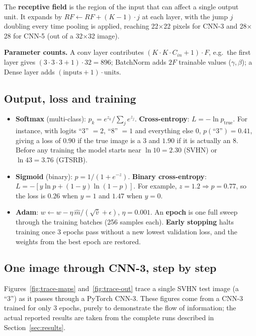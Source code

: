 \documentclass[11pt, a4paper]{article}
\begin{document}
The \textbf{receptive field} is the region of the input that can affect a single output unit. It expands by
$RF \leftarrow RF + (K-1)\cdot j$ at each layer, with the jump $j$ doubling every time pooling is applied, reaching
22$\times$22 pixels for CNN-3 and 28$\times$28 for CNN-5 (out of a 32$\times$32 image).

\textbf{Parameter counts.} A conv layer contributes $(K\cdot K\cdot C_{in}+1)\cdot F$, e.g.\ the first layer gives
$(3\cdot3\cdot3+1)\cdot32 = 896$; BatchNorm adds $2F$ trainable values ($\gamma,\beta$); a Dense layer adds
$(\text{inputs}+1)\cdot\text{units}$.

\subsection{Output, loss and training}
\begin{itemize}
\item \textbf{Softmax} (multi-class): $p_k = e^{z_k}/\sum_j e^{z_j}$. \textbf{Cross-entropy}: $L = -\ln p_{\text{true}}$.
  For instance, with logits ``3'' $=2$, ``8'' $=1$ and everything else $0$, $p(\text{``3''}) = 0.41$, giving a loss of
  $0.90$ if the true image is a 3 and $1.90$ if it is actually an 8. Before any training the model starts near
  $\ln 10 = 2.30$ (SVHN) or $\ln 43 = 3.76$ (GTSRB).
\item \textbf{Sigmoid} (binary): $p = 1/(1+e^{-z})$. \textbf{Binary cross-entropy}: $L = -[y\ln p + (1-y)\ln(1-p)]$.
  For example, $z=1.2 \Rightarrow p = 0.77$, so the loss is $0.26$ when $y=1$ and $1.47$ when $y=0$.
\item \textbf{Adam}: $w \leftarrow w - \eta\, \hat m/(\sqrt{\hat v}+\epsilon)$, $\eta = 0.001$. An \textbf{epoch} is one
  full sweep through the training batches (256 samples each). \textbf{Early stopping} halts training once 3 epochs pass
  without a new lowest validation loss, and the weights from the best epoch are restored.
\end{itemize}

\subsection{One image through CNN-3, step by step}
Figures~\ref{fig:trace-maps} and~\ref{fig:trace-out} trace a single SVHN test image (a ``3'') as it passes through a
PyTorch CNN-3. These figures come from a CNN-3 trained for only 3 epochs, purely to demonstrate the flow of
information; the actual reported results are taken from the complete runs described in Section~\ref{sec:results}.
\end{document}
